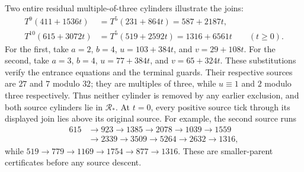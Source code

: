 \documentclass[11pt,letterpaper]{article}
\begin{document}
Two entire residual multiple-of-three cylinders illustrate the joins:
\[
\begin{aligned}
T^9(411+1536t)&=T^5(231+864t)=587+2187t,\\
T^{10}(615+3072t)&=T^5(519+2592t)=1316+6561t
\qquad(t\ge0).
\end{aligned}
\]
For the first, take \(a=2\), \(b=4\), \(u=103+384t\),
and \(v=29+108t\). For the second, take \(a=3\), \(b=4\),
\(u=77+384t\), and \(v=65+324t\).
These substitutions verify the entrance equations and the terminal guards.
Their respective sources are \(27\) and \(7\) modulo \(32\);
they are multiples of three, while \(u\equiv1\) and \(2\) modulo three
respectively. Thus neither cylinder is removed by any earlier exclusion,
and both source cylinders lie in \(\mathcal R_*\).
At \(t=0\), every positive source tick through its displayed join
lies above its original source. For example, the second source runs
\[
\begin{aligned}
615&\to923\to1385\to2078\to1039\to1559\\
   &\to2339\to3509\to5264\to2632\to1316,
\end{aligned}
\]
while \(519\to779\to1169\to1754\to877\to1316\).
These are smaller-parent certificates before any source descent.
\end{document}
